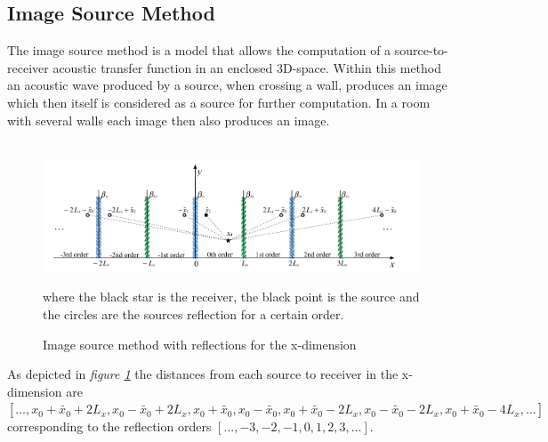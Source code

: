 \subsection{Image Source Method}\label{sec:ism}
The image source method is a model that allows the computation of a source-to-receiver acoustic transfer function in an enclosed 3D-space. Within this method an acoustic wave produced by a source, when crossing a wall, produces an image which then itself is considered as a source for further computation. In a room with several walls each image then also produces an image.\cite{Allen1979}
\\\\
\begin{figure}[H]
    \centerline{\includegraphics[width=175mm,keepaspectratio]{LaTeX/images/plots/IMS_in_x.png}}
    \caption{Image source method with reflections for the x-dimension\cite{Fu2016}} where the black star is the receiver, the black point is the source and the circles are the sources reflection for a certain order.
    \label{fig:imsX}
\end{figure}

As depicted in \textit{figure \ref{fig:imsX}} the distances from each source to receiver in the x-dimension are $[\hdots,x_0 + \tilde{x_0} + 2L_x,x_0-\tilde{x_0} + 2L_x,x_0+\tilde{x_0},x_0-\tilde{x_0},x_0+\tilde{x_0}-2L_x,x_0-\tilde{x_0}-2L_x,x_0+\tilde{x_0}-4L_x,\hdots]$ corresponding to the reflection orders $[\hdots,-3,-2,-1,0,1,2,3,\hdots]$\cite{Fu2016}.\\

